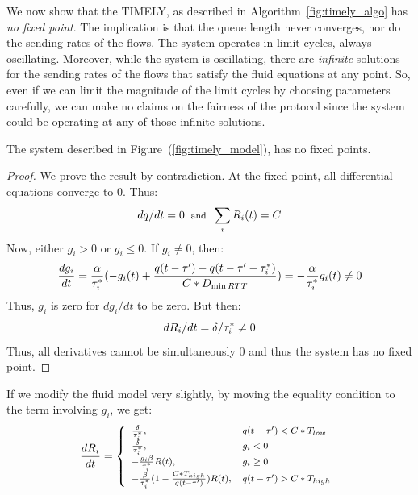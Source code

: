 We now show that the TIMELY, as described
in Algorithm~\ref{fig:timely_algo} has \emph{no fixed point}. The implication
is that the queue length never converges, nor do the sending rates of the flows.
The system operates in limit cycles, always oscillating. Moreover, while the
system is oscillating, there are \emph{infinite} solutions for the sending rates
of the flows that satisfy the fluid equations at any point. So, even if we can
limit the magnitude of the limit cycles by choosing parameters carefully, we can
make no claims on the fairness of the protocol since the system could be
operating at any of those infinite solutions.

\begin{thm} 
\label{thm:nofixed}
The system described in Figure~(\ref{fig:timely_model}), has no fixed points.
\end{thm}
\begin{proof}
We prove the result by contradiction. At the fixed point, all
differential equations converge to 0. Thus:
\begin{equation}
\small
{dq}/{dt} = 0 \; \; \mbox{and} \; \;  \sum_{i} R_i(t) =  C
\end{equation} 
Now, either $g_i > 0$ or $g_i  \le 0$. If $g_i \ne 0$, then:
\begin{equation}
\small
\frac{{dg_i}}{{dt}} =  \frac{\alpha }{{\tau_i^*}}( - g_i(t) + \frac{{q(t
                        - \tau ') - q(t - \tau ' - \tau_i^*
                        )}}{{C*{D_{\min RTT}}}})\\
 =   -\frac{\alpha }{{\tau_i^*}} g_i(t)  \ne  0
\end{equation}
Thus, $g_i$ is zero for $dg_i/dt$ to be zero. But then:
\begin{equation}
\small
{dR_i}/{dt} =  {\delta }/{{\tau_i^*}} \ne 0
\end{equation}
Thus, all derivatives cannot be simultaneously 0 and thus the system has no fixed
point.
\end{proof}

If we modify the fluid model very slightly, by moving the equality condition to
the term involving $g_i$, we get:
\begin{equation}
\small
\frac{{dR_i}}{{dt}} = \left\{ \begin{array}{ll}
\frac{\delta }{{\tau_i^*}}, & q(t - \tau ') < C*{T_{low}}\\
\frac{\delta }{{\tau_i^*}}, & g_i < 0\\
 - \frac{{g_i\beta }}{{\tau_i^*}}R(t), & g_i \ge 0\\
 - \frac{\beta }{{\tau_i^*}}(1 - \frac{{C*{T_{high}}}}{{q(t - \tau ')}})R(t), & q(t - \tau ') > C*{T_{high}}
\end{array} \right.\\
\label{eq:timely_r_modified}
\end{equation}

